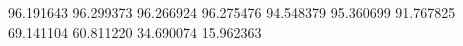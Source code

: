 96.191643
96.299373
96.266924
96.275476
94.548379
95.360699
91.767825
69.141104
60.811220
34.690074
15.962363
